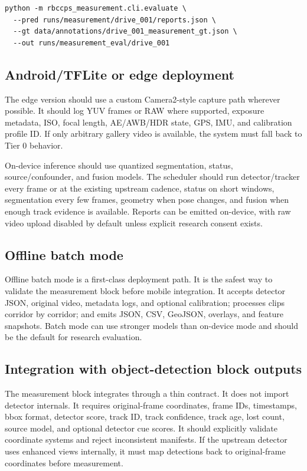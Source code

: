 \documentclass[11pt]{article}
\begin{document}
\begin{lstlisting}
python -m rbccps_measurement.cli.evaluate \
  --pred runs/measurement/drive_001/reports.json \
  --gt data/annotations/drive_001_measurement_gt.json \
  --out runs/measurement_eval/drive_001
\end{lstlisting}

\subsection{Android/TFLite or edge deployment}

The edge version should use a custom Camera2-style capture path wherever possible. It should log YUV frames or RAW where supported, exposure metadata, ISO, focal length, AE/AWB/HDR state, GPS, IMU, and calibration profile ID. If only arbitrary gallery video is available, the system must fall back to Tier 0 behavior.

On-device inference should use quantized segmentation, status, source/confounder, and fusion models. The scheduler should run detector/tracker every frame or at the existing upstream cadence, status on short windows, segmentation every few frames, geometry when pose changes, and fusion when enough track evidence is available. Reports can be emitted on-device, with raw video upload disabled by default unless explicit research consent exists.

\subsection{Offline batch mode}

Offline batch mode is a first-class deployment path. It is the safest way to validate the measurement block before mobile integration. It accepts detector JSON, original video, metadata logs, and optional calibration; processes clips corridor by corridor; and emits JSON, CSV, GeoJSON, overlays, and feature snapshots. Batch mode can use stronger models than on-device mode and should be the default for research evaluation.

\subsection{Integration with object-detection block outputs}

The measurement block integrates through a thin contract. It does not import detector internals. It requires original-frame coordinates, frame IDs, timestamps, bbox format, detector score, track ID, track confidence, track age, lost count, source model, and optional detector cue scores. It should explicitly validate coordinate systems and reject inconsistent manifests. If the upstream detector uses enhanced views internally, it must map detections back to original-frame coordinates before measurement.
\end{document}
